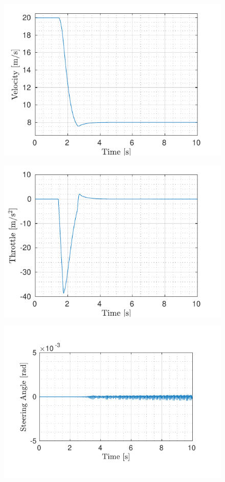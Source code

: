 \begin{figure}[!t]
\begin{minipage}[t]{0.5\textwidth}
		\includegraphics[width=\textwidth]{../../MATLAB/no_overtaking/figure/VelocityVsTime.pdf}
		\subcaption{}\label{fig:velocity_no_overtaking}
	\end{minipage}
	\begin{minipage}[t]{0.5\textwidth}
		\includegraphics[width=\textwidth]{../../MATLAB/no_overtaking/figure/ThrottleVsTime.pdf}
		\subcaption{}\label{fig:throttle_no_overtaking}
	\end{minipage}
	\begin{minipage}[t]{0.5\textwidth}
		\includegraphics[width=\textwidth]{../../MATLAB/no_overtaking/figure/SteeringAngleVsTime.pdf}

\end{minipage}
\end{figure}
